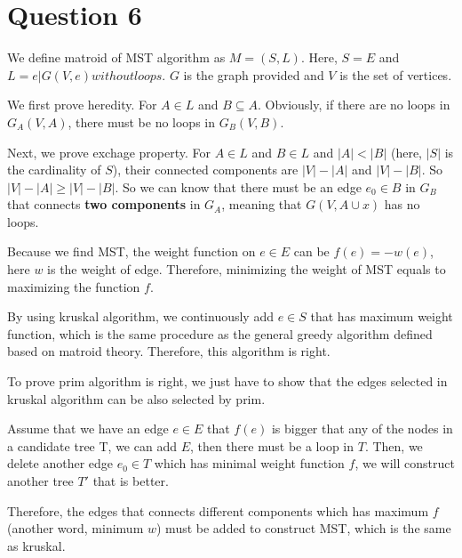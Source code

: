 \documentclass{article}
\newcommand{\question}[1]{\section*{Question #1}}
\begin{document}
\question{6}
We define matroid of MST algorithm as $M = (S, L)$. Here, $S = E$ and $L = {e | G(V, e) without loops}$. $G$ is the graph provided and $V$ is the set of vertices. \par
We first prove heredity. For $A \in L$ and $B \subseteq A$. Obviously, if there are no loops in $G_A(V, A)$, there must be no loops in $G_B(V, B)$. \par
Next, we prove exchage property. For $A \in L$ and $B \in L$ and $|A| < |B|$ (here, $|S|$ is the cardinality of $S$), their connected components are $|V| - |A|$ and $|V| - |B|$. So $|V| - |A| \geq |V| - |B|$. So we can know that there must be an edge $e_0 \in B$ in $G_B$ that connects \textbf{two components} in $G_A$, meaning that $G(V, A \cup {x})$ has no loops. \par
Because we find MST, the weight function on $e \in E$ can be $f(e) = -w(e)$, here $w$ is the weight of edge. Therefore, minimizing the weight of MST equals to maximizing the function $f$. \par
By using kruskal algorithm, we continuously add $e \in S$ that has maximum weight function, which is the same procedure as the general greedy algorithm defined based on matroid theory. Therefore, this algorithm is right. \par
To prove prim algorithm is right, we just have to show that the edges selected in kruskal algorithm can be also selected by prim. \par
Assume that we have an edge $e \in E$ that $f(e)$ is bigger that any of the nodes in a candidate tree T, we can add $E$, then there must be a loop in $T$. Then, we delete another edge $e_0 \in T$ which has minimal weight function $f$, we will construct another tree $T'$ that is better. \par
Therefore, the edges that connects different components which has maximum $f$ (another word, minimum $w$) must be added to construct MST, which is the same as kruskal.
\end{document}
